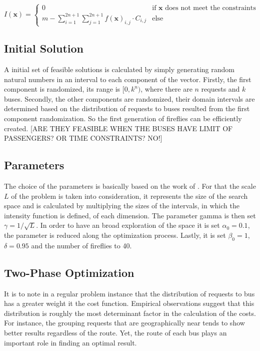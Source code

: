 \documentclass[tuberlin,cic,tc,openright,english,noabntcite]{iiufrgs}
\begin{document}
$$I(\mathbf{x}) = \begin{cases} 0 & \text{if }\mathbf{x}\text{ does not meet the constraints}\\
								m - \displaystyle\sum_{i=1}^{2n+1}\sum_{j=1}^{2n+1} f(\mathbf{x})_{i,j} \cdot C_{i,j} & \text{else}
					\end{cases}$$

\subsection{Initial Solution}
A initial set of feasible solutions is calculated by simply generating random natural numbers in an interval to each component of the vector. Firstly, the first component is randomized, its range is $[0, k^n)$, where there are $n$ requests and $k$ buses. Secondly, the other components are randomized, their domain intervals are determined based on the distribution of requests to buses resulted from the first component randomization. So the first generation of fireflies can be efficiently created. [ARE THEY FEASIBLE WHEN THE BUSES HAVE LIMIT OF PASSENGERS? OR TIME CONSTRAINTS? NO!]

\subsection{Parameters}
The choice of the parameters is basically based on the work of \autocite{Yang2013}. For that the scale $L$ of the problem is taken into consideration, it represents the size of the search space and is calculated by multiplying the sizes of the intervals, in which the intensity function is defined, of each dimension. The parameter gamma is then set $\gamma = 1/\sqrt{L}$. In order to have an broad exploration of the space it is set $\alpha_0 = 0.1$, the parameter is reduced along the optimization process. Lastly, it is set $\beta_0 = 1$, $\delta = 0.95$ and the number of fireflies to 40.

\subsection{Two-Phase Optimization}
It is to note in a regular problem instance that the distribution of requests to bus has a greater weight it the cost function. Empirical observations suggest that this distribution is roughly the most determinant factor in the calculation of the costs. For instance, the grouping requests that are geographically near tends to show better results regardless of the route. Yet, the route of each bus plays an important role in finding an optimal result.
\end{document}
